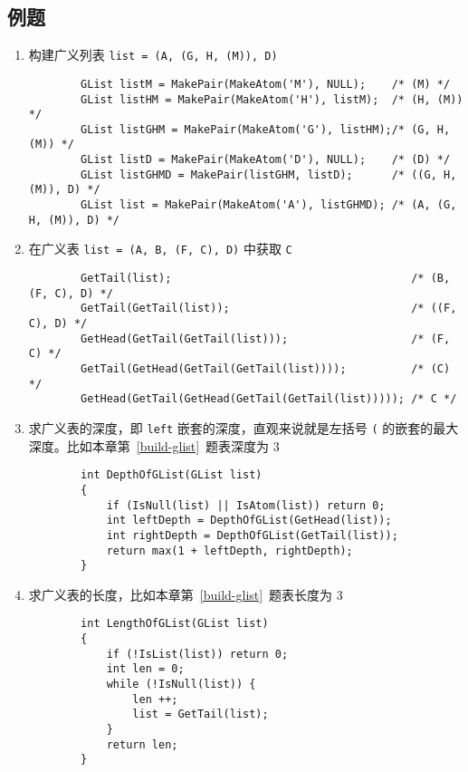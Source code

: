 \documentclass{ctexart}
\begin{document}
\subsection{例题}
\begin{enumerate}
    \item 构建广义列表 \verb|list = (A, (G, H, (M)), D)| \label{build-glist}
        \begin{verbatim}
        GList listM = MakePair(MakeAtom('M'), NULL);    /* (M) */
        GList listHM = MakePair(MakeAtom('H'), listM);  /* (H, (M)) */
        GList listGHM = MakePair(MakeAtom('G'), listHM);/* (G, H, (M)) */
        GList listD = MakePair(MakeAtom('D'), NULL);    /* (D) */
        GList listGHMD = MakePair(listGHM, listD);      /* ((G, H, (M)), D) */
        GList list = MakePair(MakeAtom('A'), listGHMD); /* (A, (G, H, (M)), D) */
        \end{verbatim}

    \item 在广义表 \verb|list = (A, B, (F, C), D)| 中获取 \verb|C|
        \begin{verbatim}
        GetTail(list);                                     /* (B, (F, C), D) */
        GetTail(GetTail(list));                            /* ((F, C), D) */
        GetHead(GetTail(GetTail(list)));                   /* (F, C) */
        GetTail(GetHead(GetTail(GetTail(list))));          /* (C) */
        GetHead(GetTail(GetHead(GetTail(GetTail(list))))); /* C */
        \end{verbatim}

    \item 求广义表的深度，即 \texttt{left} 嵌套的深度，直观来说就是左括号 \verb|(| 的嵌套的最大深度。比如本章第~\ref{build-glist}~题表深度为 3
        \begin{verbatim}
        int DepthOfGList(GList list)
        {
            if (IsNull(list) || IsAtom(list)) return 0;
            int leftDepth = DepthOfGList(GetHead(list));
            int rightDepth = DepthOfGList(GetTail(list));
            return max(1 + leftDepth, rightDepth);
        }
        \end{verbatim}

    \item 求广义表的长度，比如本章第~\ref{build-glist}~题表长度为 3
        \begin{verbatim}
        int LengthOfGList(GList list)
        {
            if (!IsList(list)) return 0;
            int len = 0;
            while (!IsNull(list)) {
                len ++;
                list = GetTail(list);
            }
            return len;
        }
        \end{verbatim}

\end{enumerate}
\end{document}
